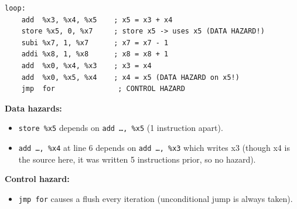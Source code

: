 \documentclass[12pt,a4paper]{article}
\begin{document}
\begin{lstlisting}[style=asmstyle, caption={fibonacci.asm (excerpt)}]
loop:
    add  %x3, %x4, %x5    ; x5 = x3 + x4
    store %x5, 0, %x7     ; store x5 -> uses x5 (DATA HAZARD!)
    subi %x7, 1, %x7      ; x7 = x7 - 1
    addi %x8, 1, %x8      ; x8 = x8 + 1
    add  %x0, %x4, %x3    ; x3 = x4
    add  %x0, %x5, %x4    ; x4 = x5 (DATA HAZARD on x5!)
    jmp  for               ; CONTROL HAZARD
\end{lstlisting}

\textbf{Data hazards:}
\begin{itemize}
    \item \texttt{store \%x5} depends on \texttt{add \ldots, \%x5} (1 instruction apart).
    \item \texttt{add \ldots, \%x4} at line 6 depends on \texttt{add \ldots, \%x3} which writes x3 (though x4 is the source here, it was written 5 instructions prior, so no hazard).
\end{itemize}

\textbf{Control hazard:}
\begin{itemize}
    \item \texttt{jmp for} causes a flush every iteration (unconditional jump is always taken).
\end{itemize}
\end{document}
